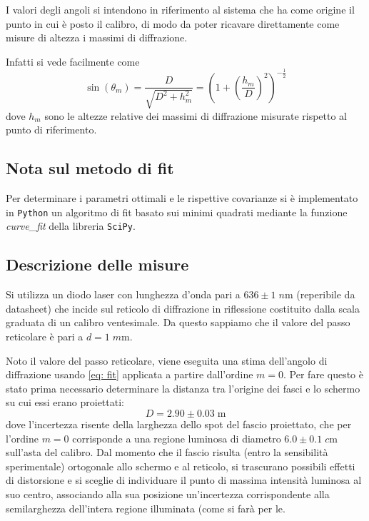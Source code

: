 \documentclass[10pt, a4paper, italian]{article}
\begin{document}
I valori degli angoli si intendono in riferimento al sistema che ha come
origine il punto in cui è posto il calibro, di modo da poter ricavare
direttamente come misure di altezza i massimi di diffrazione.

Infatti si vede facilmente come
\begin{equation}
\sin(\theta _m) = \frac{D}{\sqrt{D^2 + h_m^2}} = 
\left(1 + \left(\frac{h_m}{D}\right)^2\right)^{-\frac{1}{2}}
\label{eq: gon}
\end{equation}
dove $h_m$ sono le altezze relative dei massimi di diffrazione misurate
rispetto al punto di riferimento.

\subsection{Nota sul metodo di fit}
Per determinare i parametri ottimali e le rispettive covarianze si \`e
implementato in \verb+Python+ un algoritmo di fit basato sui minimi quadrati
mediante la funzione \emph{curve\_fit} della libreria \texttt{SciPy}.

\subsection{Descrizione delle misure}
Si utilizza un diodo laser con lunghezza d'onda pari a $636 \pm 1 \; \si{n\m}$
(reperibile da datasheet) che incide sul reticolo di diffrazione in
riflessione costituito dalla scala graduata di un calibro ventesimale.
Da questo sappiamo che il valore del passo reticolare è pari a
$d = 1 \; \si{m\m}$.

Noto il valore del passo reticolare, viene eseguita una stima dell'angolo di
diffrazione usando \cref{eq: fit} applicata a partire dall'ordine $m = 0$.
Per fare questo è stato prima necessario determinare la distanza tra l'origine
dei fasci e lo schermo su cui essi erano proiettati:
\[
D = 2.90 \pm 0.03 \; \si{\m}
\]
dove l'incertezza risente della larghezza dello spot del fascio proiettato,
che per l'ordine $m = 0$ corrisponde a una regione luminosa di diametro
$6.0 \pm 0.1 \; \si{c\m}$ sull'asta del calibro.
Dal momento che il fascio risulta (entro la sensibilità sperimentale)
ortogonale allo schermo e al reticolo, si trascurano possibili effetti di
distorsione e si sceglie di individuare il punto di massima intensità luminosa
al suo centro, associando alla sua posizione un'incertezza corrispondente
alla semilarghezza dell'intera regione illuminata (come si farà per le.
\end{document}

